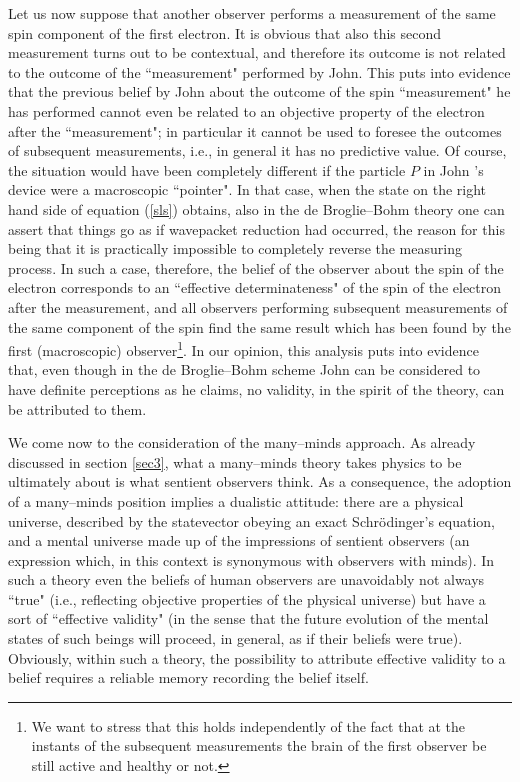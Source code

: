 \documentclass[12pt]{article}
\begin{document}
Let us now suppose that another observer performs a measurement of
the same spin component of the first electron. It is obvious that
also this second measurement turns out to be contextual, and
therefore its outcome is not related to the outcome of the
``measurement" performed by John. This puts into evidence that the
previous belief by John about the outcome of the spin
``measurement" he has performed cannot even be related to an
objective property of the electron after the ``measurement"; in
particular it cannot be used to foresee the outcomes of subsequent
measurements, i.e., in general it has no predictive value. Of course, the
situation would have been completely different if the particle $P$
in John 's device were a macroscopic ``pointer". In that case,
when the state on the right hand side of equation (\ref{sls})
obtains, also in the de Broglie--Bohm theory one can assert that
things go as if wavepacket reduction had occurred, the reason for
this being that it is practically impossible to completely reverse
the measuring process. In such a case, therefore, the belief of
the observer about the spin of the electron corresponds to an
``effective determinateness" of the spin of the electron after the
measurement, and all observers performing subsequent measurements
of the same component of the spin find the same result which has
been found by the first (macroscopic) observer\footnote{We want to
stress that this holds independently of the fact that at the
instants of the subsequent measurements the brain of the first
observer be still active and healthy or not.}. In our opinion,
this analysis puts into evidence that, even though in the de
Broglie--Bohm scheme John can be considered to have definite
perceptions as he claims, no validity, in the spirit of the
theory, can be attributed to them.

We come now to the consideration of the many--minds approach. As
already discussed in section \ref{sec3}, what a many--minds theory
takes physics to be ultimately about is what sentient observers
think. As a consequence, the adoption of a many--minds position
implies a dualistic attitude: there are a physical universe,
described by the statevector obeying an exact Schr\"odinger's
equation, and a mental universe made up of the impressions of
sentient observers (an expression which, in this context is
synonymous with observers with minds). In such a theory even the
beliefs of human observers are unavoidably not always ``true"
(i.e., reflecting objective properties of the physical universe)
but have a sort of ``effective validity" (in the sense that the
future evolution of the mental states of such beings will proceed,
in general, as if their beliefs were true). Obviously, within such
a theory, the possibility to attribute effective validity to a
belief requires a reliable memory recording the belief itself.
\end{document}
